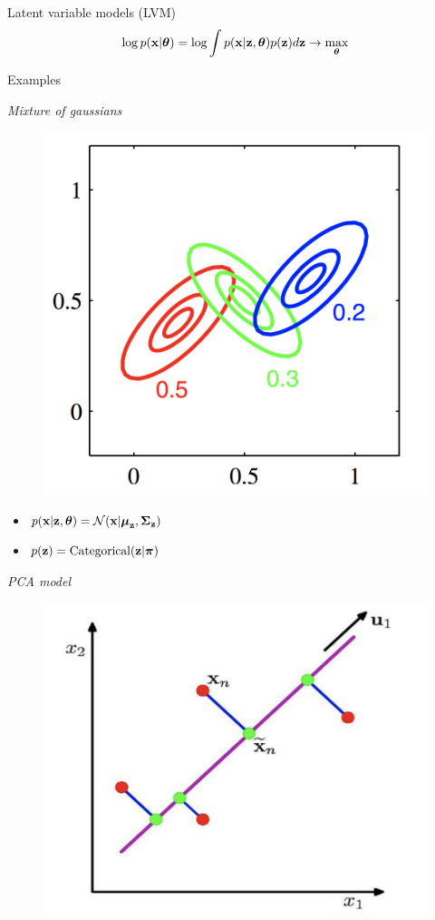 \begin{frame}{Latent variable models (LVM)}
    \[
    \log p(\mathbf{x} | \boldsymbol{\theta}) = \log \int p(\mathbf{x} | \mathbf{z}, \boldsymbol{\theta}) p(\mathbf{z}) d\mathbf{z} \rightarrow \max_{\boldsymbol{\theta}}
    \]
    \vspace{-0.6cm}
    \begin{block}{Examples}
    \begin{minipage}[t]{0.45\columnwidth}
		\textit{Mixture of gaussians} \\
		\vspace{-0.5cm}
		\begin{figure}
			\centering
			\includegraphics[width=0.75\linewidth]{figs/mixture_of_gaussians.png}
		\end{figure}
		\vspace{-0.5cm}
	    \begin{itemize}
	        \item $p(\mathbf{x} | \mathbf{z}, \boldsymbol{\theta}) = \mathcal{N}(\mathbf{x} | \boldsymbol{\mu}_{\mathbf{z}}, \boldsymbol{\Sigma}_{\mathbf{z}})$
	        \item $p(\mathbf{z}) = \text{Categorical}(\mathbf{z} | \boldsymbol{\pi})$
	    \end{itemize}
	\end{minipage}%
	\begin{minipage}[t]{0.53\columnwidth}
		\textit{PCA model} \\
		\vspace{-0.5cm}
		\begin{figure}
			\centering
			\includegraphics[width=.7\linewidth]{figs/pca.png}

\end{figure}
\end{minipage}
\end{block}
\end{frame}
